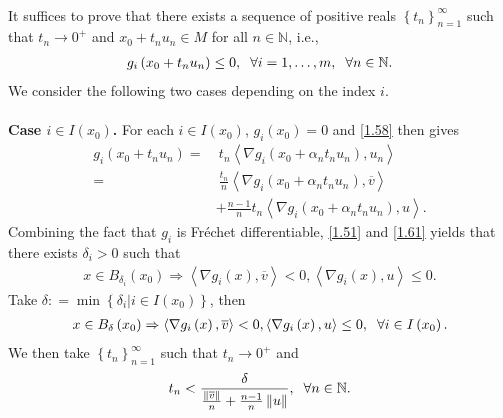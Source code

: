 \documentclass[a4paper]{article}
\numberwithin{equation}{section}
\begin{document}
\begin{enumerate}
\begin{align}
\end{align} 
It suffices to prove that there exists a sequence of positive reals $\left\{ {{t_n}} \right\}_{n = 1}^\infty $ such that $t_n\to 0^+$ and ${x_0} + {t_n}{u_n} \in M$ for all $n\in \mathbb{N}$, i.e., 
\begin{align}
{g_i}\left( {{x_0} + {t_n}{u_n}} \right) \le 0,\hspace{0.2cm} \forall i = 1, \ldots ,m, \hspace{0.2cm} \forall n \in \mathbb{N}.
\end{align}
We consider the following two cases depending on the index $i$.\\
\\
\textbf{Case $i\in I\left(x_0\right)$.} For each $i\in I\left(x_0\right)$, $g_i\left(x_0\right)=0$ and \eqref{1.58} then gives
\begin{align}
\label{1.64}
{g_i}\left( {{x_0} + {t_n}{u_n}} \right) =&\ {t_n}\left\langle {\nabla {g_i}\left( {{x_0} + {\alpha _n}{t_n}{u_n}} \right),{u_n}} \right\rangle \\
 =&\ \frac{{{t_n}}}{n}\left\langle {\nabla {g_i}\left( {{x_0} + {\alpha _n}{t_n}{u_n}} \right),\overline v } \right\rangle \\
 & + \frac{{n - 1}}{n}{t_n}\left\langle {\nabla {g_i}\left( {{x_0} + {\alpha _n}{t_n}{u_n}} \right),u} \right\rangle . \label{1.66}
\end{align}
Combining the fact that $g_i$ is Fr\'{e}chet differentiable, \eqref{1.51} and \eqref{1.61} yields that there exists $\delta _i >0$ such that
\begin{align}
x \in {B_{{\delta _i}}}\left( {{x_0}} \right) \Rightarrow \left\langle {\nabla {g_i}\left( x \right),\overline v } \right\rangle  < 0,\left\langle {\nabla {g_i}\left( x \right),u} \right\rangle  \le 0.
\end{align}
Take $\delta : = \min \left\{ {{\delta _i}|i \in I\left( {{x_0}} \right)} \right\}$, then 
\begin{align}
\label{1.68}
x \in {B_\delta }\left( {{x_0}} \right) \Rightarrow \left\langle {\nabla {g_i}\left( x \right),\overline v } \right\rangle  < 0,\left\langle {\nabla {g_i}\left( x \right),u} \right\rangle  \le 0,\hspace{0.2cm}\forall i \in I\left( {{x_0}} \right).
\end{align}
We then take $\left\{ {{t_n}} \right\}_{n = 1}^\infty $ such that $t_n\to 0^+$ and
\begin{align}
\label{1.69}
{t_n} < \frac{\delta }{{\frac{{\left\| {\overline v } \right\|}}{n} + \frac{{n - 1}}{n}\left\| u \right\|}},\hspace{0.2cm} \forall n \in \mathbb{N}.

\end{align}
\end{enumerate}
\end{document}
